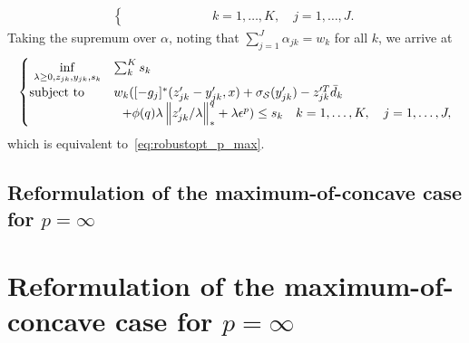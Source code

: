 \documentclass[12pt]{article}
\theoremstyle{thmstyleone}%
\theoremstyle{thmstyletwo}%
\theoremstyle{thmstylethree}%
\begin{document}
\begin{appendices}
{\begin{equation*}
\begin{aligned}
\begin{cases}
	&\hspace{2cm} \quad k = 1,\dots,K, \quad j = 1,\dots,J.
\end{cases}
\end{aligned}
\end{equation*}
Taking the supremum over $\alpha$, noting that $\sum_{j=1}^J \alpha_{jk} = w_k$ for all $k$, we arrive at
\begin{equation*}
	\begin{aligned}
\begin{cases}
	~\underset{\lambda \geq 0, z_{jk},y_{jk}, s_k}{\inf} & \sum_k^K s_k\\
	\mbox{subject to} & w_k ([-g_j]^*(z_{jk}' - y_{jk}',x) + \sigma_{\mathcal{S}}(y_{jk}') - z_{jk}'^T\bar{d}_k \\
	&~~ + \phi(q)\lambda \left\|z_{jk}'/\lambda \right\|^q_* + \lambda \epsilon^p ) \le s_k \quad k = 1,\dots,K, \quad j = 1,\dots,J,
\end{cases}
\end{aligned}
\end{equation*}
which is equivalent to~\eqref{eq:robustopt_p_max}.
}

\ifpreprint
\subsection{Reformulation of the maximum-of-concave case for ${p = \infty}$}
\else
\section{Reformulation of the maximum-of-concave case for ${p = \infty}$}
\fi
\label{app:dual_form-p_max}


\end{appendices}
\end{document}
